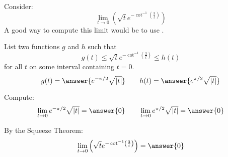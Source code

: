 \documentclass{ximera}
\author{Bart Snapp}
\begin{document}
\begin{exercise}


Consider:
\[
\lim_{t\to 0} \left(\sqrt{t} e^{-\cot ^{-1}\left(\frac{3}{t}\right)}\right)
\]
A good way to compute this limit would be to use .
\begin{exercise}
List two functions $g$ and $h$ such that
\[
g(t)\le \sqrt{t} e^{-\cot ^{-1}\left(\frac{3}{t}\right)} \le h(t)
\]
for all $t$ on some interval containing $t=0$.
\[
g(t)=\answer{e^{-\pi /2} \sqrt{\left| t\right| }}\qquad h(t) =\answer{e^{\pi /2} \sqrt{\left| t\right| }}
\]
\begin{exercise}
Compute:
\[
\lim_{t \to 0}e^{-\pi /2} \sqrt{\left| t\right| } = \answer{0}\qquad \lim_{t\to 0}e^{\pi /2} \sqrt{\left| t\right| } = \answer{0}
\]
\begin{exercise}
By the Squeeze Theorem:
\[
\lim_{t\to 0} \left(\sqrt{t} e^{-\cot ^{-1}\left(\frac{3}{t}\right)}\right) = \answer{0}
\]
\end{exercise}
\end{exercise}
\end{exercise}
\end{exercise}
\end{document}
